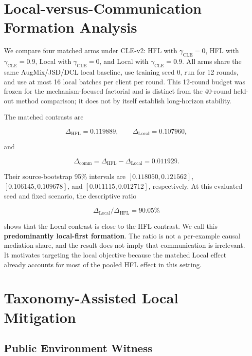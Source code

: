 \section{Local-versus-Communication Formation Analysis}

We compare four matched arms under CLE-v2: HFL with \(\gamma_{\mathrm{CLE}}=0\), HFL with \(\gamma_{\mathrm{CLE}}=0.9\), Local with \(\gamma_{\mathrm{CLE}}=0\), and Local with \(\gamma_{\mathrm{CLE}}=0.9\). All arms share the same AugMix/JSD/DCL local baseline, use training seed 0, run for 12 rounds, and use at most 16 local batches per client per round. This 12-round budget was frozen for the mechanism-focused factorial and is distinct from the 40-round held-out method comparison; it does not by itself establish long-horizon stability.



The matched contrasts are

\[
\Delta_{\mathrm{HFL}}=0.119889,\qquad
\Delta_{\mathrm{Local}}=0.107960,
\]

and

\[
\Delta_{\mathrm{comm}}
=\Delta_{\mathrm{HFL}}-\Delta_{\mathrm{Local}}
=0.011929.
\]

Their source-bootstrap 95\% intervals are \([0.118050,0.121562]\), \([0.106145,0.109678]\), and \([0.011115,0.012712]\), respectively. At this evaluated seed and fixed scenario, the descriptive ratio

\[
\Delta_{\mathrm{Local}}/\Delta_{\mathrm{HFL}}=90.05\%
\]

shows that the Local contrast is close to the HFL contrast. We call this \textbf{predominantly local-first formation}. The ratio is not a per-example causal mediation share, and the result does not imply that communication is irrelevant. It motivates targeting the local objective because the matched Local effect already accounts for most of the pooled HFL effect in this setting.


\section{Taxonomy-Assisted Local Mitigation}

\subsection{Public Environment Witness}

